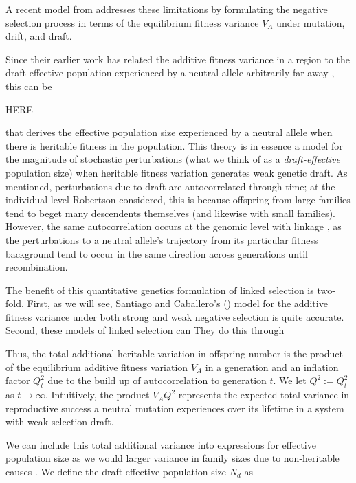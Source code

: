 \documentclass[11pt]{article}
\begin{document}
A recent model from \textcite{Santiago2016-mu} addresses these limitations by
formulating the negative selection process in terms of the equilibrium fitness
variance $V_A$ under mutation, drift, and draft. 


Since their earlier work has
related the additive fitness variance in a region to the draft-effective
population experienced by a neutral allele arbitrarily far away
\parencite{Santiago1998-bs}, this can be 

HERE

that derives the effective population
size experienced by a neutral allele when there is heritable fitness in the
population. This theory is in essence a model for the magnitude of stochastic
perturbations (what we think of as a \emph{draft-effective} population size)
when heritable fitness variation generates weak genetic draft. As mentioned,
perturbations due to draft are autocorrelated through time; at the individual
level Robertson considered, this is because offspring from large families tend
to beget many descendents themselves (and likewise with small families).
However, the same autocorrelation occurs at the genomic level with linkage
\parencite{Santiago1998-bs}, as the perturbations to a neutral allele's
trajectory from its particular fitness background tend to occur in the same
direction across generations until recombination.

The benefit of this quantitative genetics formulation of linked selection is
two-fold. First, as we will see, Santiago and Caballero's
(\citeyear{Santiago2016-mu}) model for the additive fitness variance under both
strong and weak negative selection is quite accurate. Second, these models of
linked selection can 
They do this through 


Thus, the total additional
heritable variation in offspring number is the product of the equilibrium
additive fitness variation $V_A$ in a generation and an inflation factor
$Q_t^2$ due to the build up of autocorrelation to generation $t$. We let $Q^2
:= Q_t^2$ as $t \to \infty$. Intuitively, the product $V_A Q^2$ represents the
expected total variance in reproductive success a neutral mutation experiences
over its lifetime in a system with weak selection draft. 

We can include this total additional variance into expressions for effective
population size as we would larger variance in family sizes due to
non-heritable causes \parencite{Wright1938-tv}. We define the draft-effective
population size $N_d$ as
\end{document}
